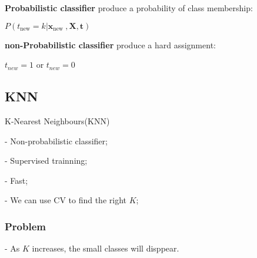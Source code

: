 \documentclass[12pt]{article}
\begin{document}
\textbf{Probabilistic classifier} produce a probability of class membership:

$P(t_{\text {new}}=k | \mathbf{x}_{\text {new }}, \mathbf{X}, \mathbf{t})$

\textbf{non-Probabilistic classifier} produce a hard assignment:

$t_{new}=1$ or $t_{new}=0$

\subsection{KNN}

K-Nearest Neighbours(KNN)

- Non-probabilistic classifier;

- Supervised trainning;

- Fast;

- We can use CV to find the right $K$;

\subsubsection{Problem}
- As $K$ increases, the small classes will disppear.
\end{document}
